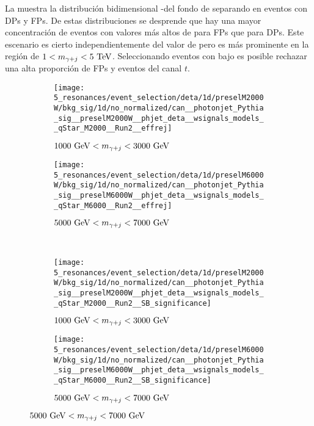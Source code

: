 La \Fig{\ref{fig:evt_selection:sr_opt:eta:deta:2d}} muestra la distribución bidimensional \Deta-\myj del fondo de \gammajet separando en eventos con \acp{DP} y \acp{FP}.
De estas distribuciones se desprende que hay una mayor concentración de eventos con valores más altos de \detayj para \acp{FP} que para \acp{DP}. Este escenario es cierto independientemente del valor de \myj pero es más prominente en la región de \(1 < m_{\gamma+j} < 5~\text{TeV}\). Seleccionando eventos con \detayj bajo es posible rechazar una alta proporción de \acp{FP} y eventos del canal \(t\).

\begin{figure}[ht!]
    \centering
    \begin{subfigure}[h]{0.49\linewidth}
        \centering
        \texttt{[image: 5\_resonances/event\_selection/deta/1d/preselM2000W/bkg\_sig/1d/no\_normalized/can\_\_photonjet\_Pythia\_sig\_\_preselM2000W\_\_phjet\_deta\_\_wsignals\_models\_\_qStar\_M2000\_\_Run2\_\_effrej]}
        \caption{\(1000~\text{GeV} < m_{\gamma+j} < 3000~\text{GeV}\)}
        \label{fig:evt_selection:sr_opt:eta:deta:1d:effrej_2000W}
    \end{subfigure}
    \hfill
    \begin{subfigure}[h]{0.49\linewidth}
        \centering
        \texttt{[image: 5\_resonances/event\_selection/deta/1d/preselM6000W/bkg\_sig/1d/no\_normalized/can\_\_photonjet\_Pythia\_sig\_\_preselM6000W\_\_phjet\_deta\_\_wsignals\_models\_\_qStar\_M6000\_\_Run2\_\_effrej]}
        \caption{\(5000~\text{GeV} < m_{\gamma+j} < 7000~\text{GeV}\)}
        \label{fig:evt_selection:sr_opt:eta:deta:1d:effrej_6000W}
    \end{subfigure}\\
    \begin{subfigure}[h]{0.49\linewidth}
        \centering
        \texttt{[image: 5\_resonances/event\_selection/deta/1d/preselM2000W/bkg\_sig/1d/no\_normalized/can\_\_photonjet\_Pythia\_sig\_\_preselM2000W\_\_phjet\_deta\_\_wsignals\_models\_\_qStar\_M2000\_\_Run2\_\_SB\_significance]}
        \caption{\(1000~\text{GeV} < m_{\gamma+j} < 3000~\text{GeV}\)}
        \label{fig:evt_selection:sr_opt:eta:deta:1d:SB_2000W}
    \end{subfigure}
    \hfill
    \begin{subfigure}[h]{0.49\linewidth}
        \centering
        \texttt{[image: 5\_resonances/event\_selection/deta/1d/preselM6000W/bkg\_sig/1d/no\_normalized/can\_\_photonjet\_Pythia\_sig\_\_preselM6000W\_\_phjet\_deta\_\_wsignals\_models\_\_qStar\_M6000\_\_Run2\_\_SB\_significance]}
        \caption{\(5000~\text{GeV} < m_{\gamma+j} < 7000~\text{GeV}\)}
        \label{fig:evt_selection:sr_opt:eta:deta:1d:SB_6000W}

\end{subfigure}
\end{figure}
